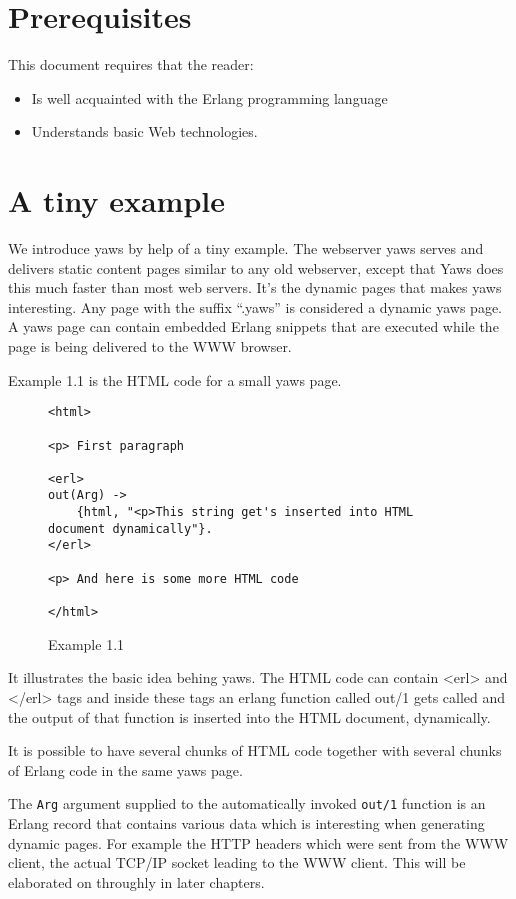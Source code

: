 \documentclass[11pt,oneside,english]{book}
\begin{document}
\section{Prerequisites}
This document requires that the reader:
\begin{itemize}
\item Is well acquainted with the Erlang programming language
\item Understands basic Web technologies.
\end{itemize}


\section{A tiny example}

We introduce yaws by help of a tiny example. 
 The webserver yaws serves  and delivers
static content pages similar to any old webserver, except that Yaws does this 
much faster than most web servers. It's the dynamic pages
that makes yaws interesting. Any page with the suffix ``.yaws'' is considered
a dynamic yaws page. A yaws page can contain embedded Erlang snippets that
are executed while the page is being delivered to the WWW browser.

Example 1.1 is the HTML code for a small yaws page.


\begin{figure}[h]
\begin{verbatim}
<html>

<p> First paragraph

<erl>
out(Arg) ->
    {html, "<p>This string get's inserted into HTML document dynamically"}.
</erl>

<p> And here is some more HTML code

</html>
\end{verbatim}
\caption{Example 1.1}
\end{figure}

It illustrates the basic idea behing yaws. The HTML code
can contain <erl> and </erl> tags and inside these tags an erlang function
called out/1 gets called and the output of that function is inserted
into the HTML document, dynamically. 

It is possible to have several chunks of HTML code together with several 
chunks of Erlang code in the same yaws page.

The \verb+Arg+ argument supplied to the automatically invoked \verb+out/1+
function is an Erlang record that contains various data which is interesting 
when generating dynamic pages. For example the HTTP headers which were sent
from the WWW client, the actual TCP/IP socket leading to the WWW client.
This will be elaborated on throughly in later chapters. 
\end{document}

